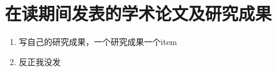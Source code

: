 
\clearpage
{}
{}
{\centering\section*{在读期间发表的学术论文及研究成果}}
\begin{enumerate}
    \item 写自己的研究成果，一个研究成果一个item
    \item 反正我没发
\end{enumerate}
\newpage